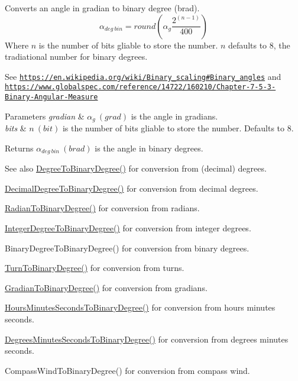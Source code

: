 Converts an angle in gradian to binary degree (brad). \[\alpha_{deg\ bin}=round(\alpha_{g}\frac{2^{(n-1)}}{400})\] Where $n$ is the number of bits gliable to store the number. $n$ defaults to 8, the tradiational number for binary degrees. 

See \href{https://en.wikipedia.org/wiki/Binary_scaling#Binary_angles}{\tt https\+://en.\+wikipedia.\+org/wiki/\+Binary\+\_\+scaling\#\+Binary\+\_\+angles} and \href{https://www.globalspec.com/reference/14722/160210/Chapter-7-5-3-Binary-Angular-Measure}{\tt https\+://www.\+globalspec.\+com/reference/14722/160210/\+Chapter-\/7-\/5-\/3-\/\+Binary-\/\+Angular-\/\+Measure} 
\begin{DoxyParams}{Parameters}
{\em gradian} & $\alpha_{g}\ (grad)$ is the angle in gradians. \\
\hline
{\em bits} & $n\ (bit)$ is the number of bits gliable to store the number. Defaults to 8. \\
\hline
\end{DoxyParams}
\begin{DoxyReturn}{Returns}
$\alpha_{deg\ bin}\ (brad)$ is the angle in binary degrees. 
\end{DoxyReturn}
\begin{DoxySeeAlso}{See also}
\mbox{\hyperlink{group___e_g_x_math-_angle_conversions-_degree_gacd1e3dc5194e89426a899a7cac4874f8}{Degree\+To\+Binary\+Degree()}} for conversion from (decimal) degrees. 

\mbox{\hyperlink{group___e_g_x_math-_angle_conversions-_decimal_degree_gaceec7ae7988c7f342d0b0fa6940720a1}{Decimal\+Degree\+To\+Binary\+Degree()}} for conversion from decimal degrees. 

\mbox{\hyperlink{group___e_g_x_math-_angle_conversions-_radian_ga13311d9b6977d514f1d6c336e7c0162b}{Radian\+To\+Binary\+Degree()}} for conversion from radians. 

\mbox{\hyperlink{group___e_g_x_math-_angle_conversions-_integer_degree_ga694bbfe624c3c14e97ce6155ca9bc44d}{Integer\+Degree\+To\+Binary\+Degree()}} for conversion from integer degrees. 

Binary\+Degree\+To\+Binary\+Degree() for conversion from binary degrees. 

\mbox{\hyperlink{group___e_g_x_math-_angle_conversions-_turn_ga678efb8f5c3958351fc3f1dfaf117b28}{Turn\+To\+Binary\+Degree()}} for conversion from turns. 

\mbox{\hyperlink{group___e_g_x_math-_angle_conversions-_gradian_ga6bf31920148bfd61f1f06eb961c3f62b}{Gradian\+To\+Binary\+Degree()}} for conversion from gradians. 

\mbox{\hyperlink{group___e_g_x_math-_angle_conversions-_hours_minutes_seconds_ga962a367fd21f0047eb0a7116a59c2bfc}{Hours\+Minutes\+Seconds\+To\+Binary\+Degree()}} for conversion from hours minutes seconds. 

\mbox{\hyperlink{group___e_g_x_math-_angle_conversions-_degrees_minutes_seconds_ga838c47916ce872cab2dfecd5ccf0a6ee}{Degrees\+Minutes\+Seconds\+To\+Binary\+Degree()}} for conversion from degrees minutes seconds. 

Compass\+Wind\+To\+Binary\+Degree() for conversion from compass wind. 
\end{DoxySeeAlso}

